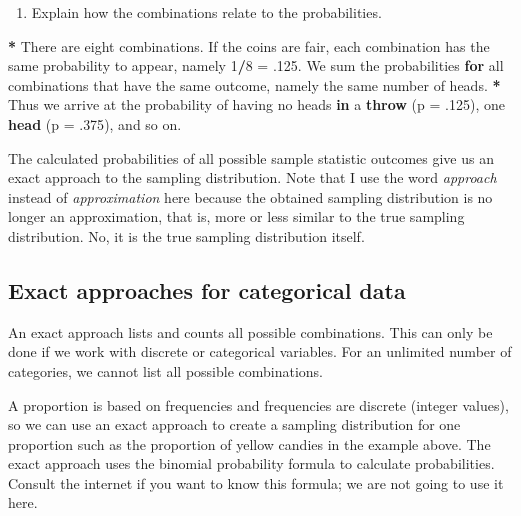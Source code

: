 \documentclass[a4paper]{book}
\newenvironment{Shaded}{\begin{snugshade}}{\end{snugshade}}
\newcommand{\KeywordTok}[1]{\textcolor[rgb]{0,0,0}{\textbf{#1}}}
\newcommand{\DataTypeTok}[1]{\textcolor[rgb]{0,0,0}{#1}}
\newcommand{\DecValTok}[1]{\textcolor[rgb]{0.00,0.00,0.00}{#1}}
\newcommand{\StringTok}[1]{\textcolor[rgb]{0.00,0.00,0.00}{#1}}
\newcommand{\ControlFlowTok}[1]{\textcolor[rgb]{0.00,0.00,0.00}{\textbf{#1}}}
\newcommand{\OperatorTok}[1]{\textcolor[rgb]{0.00,0.00,0.00}{\textbf{#1}}}
\newcommand{\NormalTok}[1]{#1}
\providecommand{\tightlist}{%
  \setlength{\itemsep}{0pt}\setlength{\parskip}{0pt}}
\theoremstyle{definition}
\theoremstyle{definition}
\theoremstyle{definition}
\theoremstyle{remark}
\begin{document}
\begin{enumerate}
\def\labelenumi{\arabic{enumi}.}
\setcounter{enumi}{1}
\tightlist
\item
  Explain how the combinations relate to the probabilities.
\end{enumerate}

\begin{Shaded}
\begin{Highlighting}[]
\OperatorTok{*}\StringTok{ }\NormalTok{There are eight combinations. If the coins are fair, each combination has}
\NormalTok{the same probability to appear, namely }\DecValTok{1}\OperatorTok{/}\DecValTok{8}\NormalTok{ =}\StringTok{ }\NormalTok{.}\DecValTok{125}\NormalTok{. We sum the probabilities }\ControlFlowTok{for}
\NormalTok{all combinations that have the same outcome, namely the same number of heads.}
\OperatorTok{*}\StringTok{ }\NormalTok{Thus we arrive at the probability of having no heads }\ControlFlowTok{in}\NormalTok{ a }\KeywordTok{throw}\NormalTok{ (}\DataTypeTok{p =}\NormalTok{ .}\DecValTok{125}\NormalTok{),}
\NormalTok{one }\KeywordTok{head}\NormalTok{ (}\DataTypeTok{p =}\NormalTok{ .}\DecValTok{375}\NormalTok{), and so on.}
\end{Highlighting}
\end{Shaded}

The calculated probabilities of all possible sample statistic outcomes
give us an exact approach to the sampling distribution. Note that I use
the word \emph{approach} instead of \emph{approximation} here because
the obtained sampling distribution is no longer an approximation, that
is, more or less similar to the true sampling distribution. No, it is
the true sampling distribution itself.

\subsection{Exact approaches for categorical
data}\label{exact-approaches-for-categorical-data}

An exact approach lists and counts all possible combinations. This can
only be done if we work with discrete or categorical variables. For an
unlimited number of categories, we cannot list all possible
combinations.

A proportion is based on frequencies and frequencies are discrete
(integer values), so we can use an exact approach to create a sampling
distribution for one proportion such as the proportion of yellow candies
in the example above. The exact approach uses the binomial probability
formula to calculate probabilities. Consult the internet if you want to
know this formula; we are not going to use it here.
\end{document}
